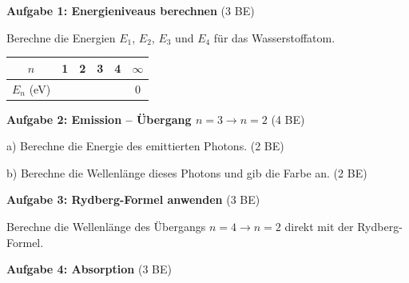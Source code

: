 \documentclass[11pt,a4paper]{article}
\begin{document}
\vspace{0.5em}


\textbf{Aufgabe 1: Energieniveaus berechnen} \hfill (3 BE)

Berechne die Energien $E_1$, $E_2$, $E_3$ und $E_4$ für das Wasserstoffatom.

\vspace{0.3em}

\begin{center}
\begin{tabular}{|c|c|c|c|c|c|}
\hline
$n$ & 1 & 2 & 3 & 4 & $\infty$ \\
\hline
$E_n$ (eV) & & & & & 0 \\
\hline
\end{tabular}
\end{center}

\vspace{1.5cm}


\textbf{Aufgabe 2: Emission -- Übergang $n = 3 \to n = 2$} \hfill (4 BE)

a) Berechne die Energie des emittierten Photons. (2 BE)

\vspace{1.8cm}

b) Berechne die Wellenlänge dieses Photons und gib die Farbe an. (2 BE)

\vspace{1.8cm}


\textbf{Aufgabe 3: Rydberg-Formel anwenden} \hfill (3 BE)

Berechne die Wellenlänge des Übergangs $n = 4 \to n = 2$ direkt mit der Rydberg-Formel.

\vspace{3cm}


\textbf{Aufgabe 4: Absorption} \hfill (3 BE)
\end{document}
